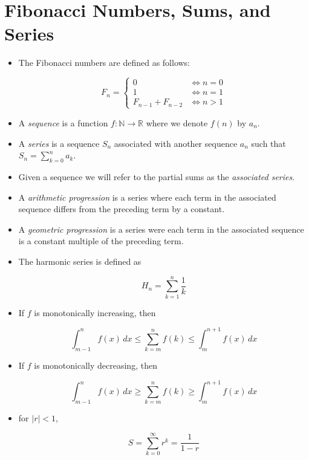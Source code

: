 \documentclass[12pt]{scrartcl}
\begin{document}
\section{Fibonacci Numbers, Sums, and Series}
\begin{itemize}
    \item The Fibonacci numbers are defined as follows:

        \begin{equation*}
            F_n = \begin{cases}
                0 & \Leftrightarrow n = 0 \\
                1 & \Leftrightarrow n = 1 \\
                F_{n-1} + F_{n - 2} & \Leftrightarrow n > 1
            \end{cases}
        \end{equation*}

    \item A \textit{sequence} is a function $f: \mathbb{N} \rightarrow \mathbb{R}$ where we denote $f(n)$ by $a_n$.
    \item A \textit{series} is a sequence $S_n$ associated with another sequence $a_n$ such that $S_n = \sum _{k = 0} ^n a_k$.
    \item Given a sequence we will refer to the partial sums as the \textit{associated series}.
    \item A \textit{arithmetic progression} is a series where each term in the associated sequence differs from the preceding term by a constant.
    \item A \textit{geometric progression} is a series were each term in the associated sequence is a constant multiple of the preceding term.
    \item The harmonic series is defined as

        \begin{equation*}
            H_n = \sum _{k = 1} ^n \frac{1}{k}
        \end{equation*}

    \item If $f$ is monotonically increasing, then

        \begin{equation*}
            \int_{m - 1} ^n f(x)\, dx \leq
            \sum_{k = m} ^n f(k) \leq
            \int_m ^{n + 1} f(x)\, dx
        \end{equation*}


    \item If $f$ is monotonically decreasing, then

        \begin{equation*}
            \int_{m - 1} ^n f(x)\, dx \geq
            \sum_{k = m} ^n f(k) \geq
            \int_m ^{n + 1} f(x)\, dx
        \end{equation*}

    \item for $|r| < 1$,

        \begin{equation*}
            S = \sum _{k = 0} ^\infty r^k = \frac{1}{1 - r}
        \end{equation*}
\end{itemize}
\end{document}
